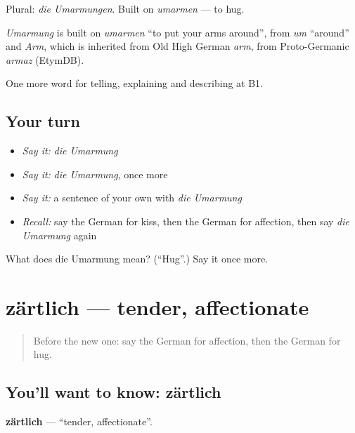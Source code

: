 Plural: \emph{die Umarmungen}. Built on \emph{umarmen} — to hug.

\begin{cousinweb}
\emph{Umarmung} is built on \emph{umarmen} \textquotedblleft{}to put your arms around\textquotedblright{}, from \emph{um} \textquotedblleft{}around\textquotedblright{} and \emph{Arm}, which is inherited from Old High German \emph{arm}, from Proto-Germanic \emph{armaz} (EtymDB).
\end{cousinweb}

\begin{grammarlens}[title={What you've built}]
One more word for telling, explaining and describing at B1.
\end{grammarlens}

\subsection*{Your turn}
\begin{itemize}
\raggedright
  \item \emph{Say it:} \emph{die Umarmung}
  \item \emph{Say it:} \emph{die Umarmung}, once more
  \item \emph{Say it:} a sentence of your own with \emph{die Umarmung}
  \item \emph{Recall:} say the German for kiss, then the German for affection, then say \emph{die Umarmung} again
\end{itemize}

\begin{tcolorbox}[breakable,colback=teal!4,colframe=teal!35!black,title={Before you move on}]
What does die Umarmung mean? (\textquotedblleft{}Hug\textquotedblright{}.) Say it once more.
\end{tcolorbox}
\section[zärtlich]{zärtlich — tender, affectionate}

\label{lesson:GE-C493-zaertlich}



\begin{quote}
Before the new one: say the German for affection, then the German for hug.
\end{quote}

\subsection*{You'll want to know: zärtlich}
\textbf{zärtlich} — \textquotedblleft{}tender, affectionate\textquotedblright{}.

